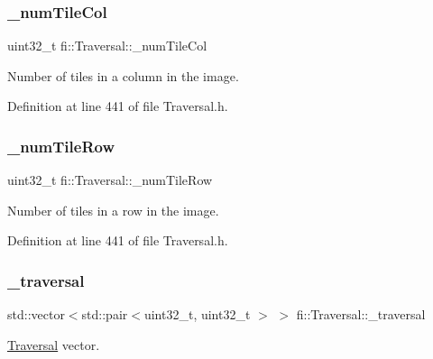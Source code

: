 \subsubsection{\texorpdfstring{\+\_\+num\+Tile\+Col}{\_numTileCol}}
{\footnotesize\ttfamily uint32\+\_\+t fi\+::\+Traversal\+::\+\_\+num\+Tile\+Col\hspace{0.3cm}{\ttfamily [private]}}



Number of tiles in a column in the image. 



Definition at line 441 of file Traversal.\+h.

\mbox{\label{classfi_1_1Traversal_a016eee999dea6324d1862544b77456e2}} 
\subsubsection{\texorpdfstring{\+\_\+num\+Tile\+Row}{\_numTileRow}}
{\footnotesize\ttfamily uint32\+\_\+t fi\+::\+Traversal\+::\+\_\+num\+Tile\+Row\hspace{0.3cm}{\ttfamily [private]}}



Number of tiles in a row in the image. 



Definition at line 441 of file Traversal.\+h.

\mbox{\label{classfi_1_1Traversal_abbf52b87c2d169d3359fcf440d916aab}} 
\subsubsection{\texorpdfstring{\+\_\+traversal}{\_traversal}}
{\footnotesize\ttfamily std\+::vector$<$std\+::pair$<$uint32\+\_\+t, uint32\+\_\+t $>$ $>$ fi\+::\+Traversal\+::\+\_\+traversal\hspace{0.3cm}{\ttfamily [private]}}



\hyperlink{classfi_1_1Traversal}{Traversal} vector. 



